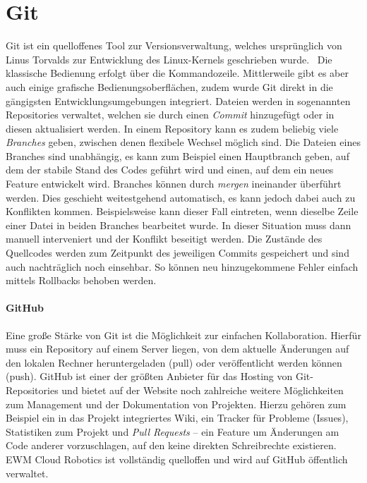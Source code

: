 \section{Git}
Git ist ein quelloffenes Tool zur Versionsverwaltung, welches ursprünglich von Linus Torvalds zur Entwicklung des Linux-Kernels geschrieben wurde.~\cite{vetter.2019}
Die klassische Bedienung erfolgt über die Kommandozeile.
Mittlerweile gibt es aber auch einige grafische Bedienungsoberflächen, zudem wurde Git direkt in die gängigsten Entwicklungsumgebungen integriert.
Dateien werden in sogenannten Repositories verwaltet, welchen sie durch einen \emph{Commit} hinzugefügt oder in diesen aktualisiert werden.
In einem Repository kann es zudem beliebig viele \emph{Branches} geben, zwischen denen flexibele Wechsel möglich sind.
Die Dateien eines Branches sind unabhängig, \dash es kann zum Beispiel einen Hauptbranch geben, auf dem der stabile Stand des Codes geführt wird und einen, auf dem ein neues Feature entwickelt wird.
Branches können durch \emph{mergen} ineinander überführt werden.
Dies geschieht weitestgehend automatisch, es kann jedoch dabei auch zu Konflikten kommen.
Beispielsweise kann dieser Fall eintreten, wenn dieselbe Zeile einer Datei in beiden Branches bearbeitet wurde.
In dieser Situation muss dann manuell interveniert und der Konflikt beseitigt werden.
Die Zustände des Quellcodes werden zum Zeitpunkt des jeweiligen Commits gespeichert und sind auch nachträglich noch einsehbar.
So können neu hinzugekommene Fehler einfach mittels Rollbacks behoben werden.~\cite{dudler}

\paragraph{GitHub}
Eine große Stärke von Git ist die Möglichkeit zur einfachen Kollaboration.
Hierfür muss ein Repository auf einem Server liegen, von dem aktuelle Änderungen auf den lokalen Rechner heruntergeladen (pull) oder veröffentlicht werden können (push).
GitHub ist einer der größten Anbieter für das Hosting von Git-Repositories und bietet auf der Website noch zahlreiche weitere Möglichkeiten zum Management und der Dokumentation von Projekten.
Hierzu gehören zum Beispiel ein in das Projekt integriertes Wiki, ein Tracker für Probleme (Issues), Statistiken zum Projekt und \emph{Pull Requests} -- ein Feature um Änderungen am Code anderer vorzuschlagen, auf den keine direkten Schreibrechte existieren.~\cite{github.doc}
\ac{EWM} Cloud Robotics ist vollständig quelloffen und wird auf GitHub öffentlich verwaltet.


